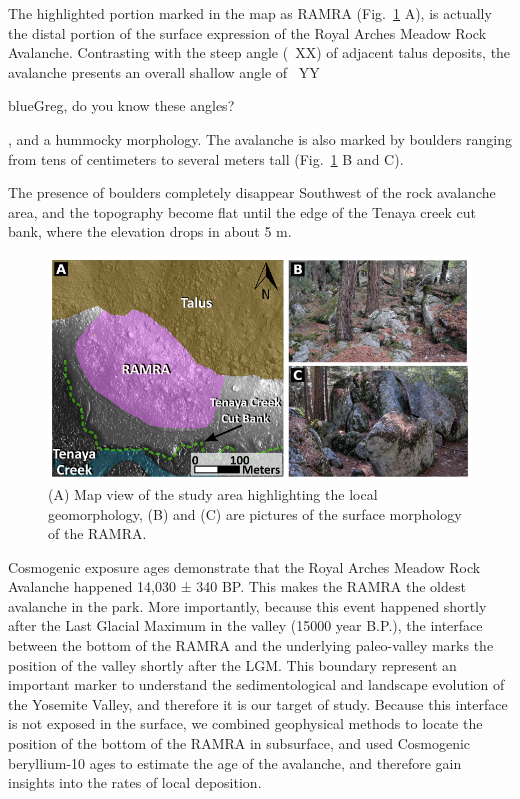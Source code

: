 \documentclass[5p]{elsarticle}
\newcommand{\COMON}{\begin{color}{blue}}
\newcommand{\COMOFF}{\end{color}}
\begin{document}
The highlighted portion marked in the map as RAMRA (Fig.~\ref{RAMRA} A), is actually the distal portion of the surface expression of the Royal Arches Meadow Rock Avalanche. Contrasting with the steep angle (~XX) of adjacent talus deposits, the avalanche presents an overall shallow angle of ~YY \COMON Greg, do you know these angles? \COMOFF, and a hummocky morphology. The avalanche is also marked by boulders ranging from tens of centimeters to several meters tall (Fig.~\ref{RAMRA} B and C).

The presence of boulders completely disappear Southwest of the rock avalanche area, and the topography become flat until the edge of the Tenaya creek cut bank, where the elevation drops in about 5 m. 



                             \begin{figure}[h]

  \includegraphics[width=\textwidth]{RAMRA.png}
  \caption{(A) Map view of the study area highlighting the local geomorphology, (B) and (C) are pictures of the surface morphology of the RAMRA.  
  \label{RAMRA}}
  
                            \end{figure}



Cosmogenic  exposure ages demonstrate that the Royal Arches Meadow Rock Avalanche happened 14,030 ± 340 BP. This makes the RAMRA the oldest avalanche in the park. More importantly, because this event happened shortly after the Last Glacial Maximum in the valley (15000 year B.P.), the interface between the bottom of the RAMRA and the underlying paleo-valley marks the position of the valley shortly after the LGM. This boundary represent an important marker to understand the sedimentological and landscape evolution of the Yosemite Valley, and therefore it is our target of study. Because this interface is not exposed in the surface, we combined geophysical methods to locate the position of the bottom of the RAMRA in subsurface, and used Cosmogenic beryllium-10 ages to estimate the age of the avalanche, and therefore  gain insights into the rates of local deposition.
\end{document}
